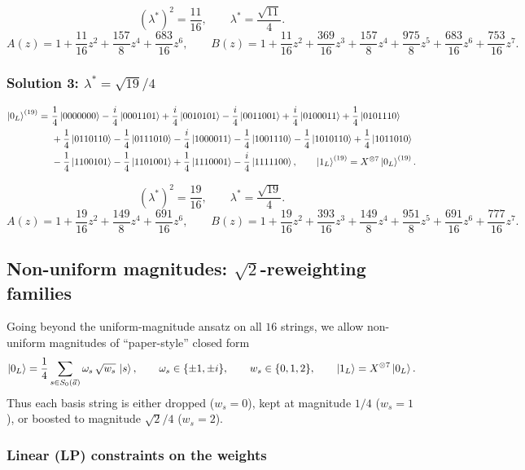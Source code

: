 \documentclass[11pt]{article}
\begin{document}
\[
\boxed{(\lambda^\ast)^2=\frac{11}{16},\qquad \lambda^\ast=\frac{\sqrt{11}}{4}.}
\]
\[
A(z)=1+\frac{11}{16}z^2+\frac{157}{8}z^4+\frac{683}{16}z^6,\qquad
B(z)=1+\frac{11}{16}z^2+\frac{369}{16}z^3+\frac{157}{8}z^4+\frac{975}{8}z^5+\frac{683}{16}z^6+\frac{753}{16}z^7.
\]

\subsubsection{Solution 3: \texorpdfstring{$\lambda^\ast=\sqrt{19}/4$}{lambda*=sqrt19/4}}

\[
\begin{aligned}
\ket{0_L}^{(19)}=
&\ \frac{1}{4}\ket{0000000}
-\frac{i}{4}\ket{0001101}
+\frac{i}{4}\ket{0010101}
-\frac{i}{4}\ket{0011001}
+\frac{i}{4}\ket{0100011}
+\frac{1}{4}\ket{0101110}\\
&\ +\frac{1}{4}\ket{0110110}
-\frac{1}{4}\ket{0111010}
-\frac{i}{4}\ket{1000011}
-\frac{1}{4}\ket{1001110}
-\frac{1}{4}\ket{1010110}
+\frac{1}{4}\ket{1011010}\\
&\ -\frac{1}{4}\ket{1100101}
-\frac{1}{4}\ket{1101001}
+\frac{1}{4}\ket{1110001}
-\frac{i}{4}\ket{1111100},\qquad
\ket{1_L}^{(19)}=X^{\otimes 7}\ket{0_L}^{(19)}.
\end{aligned}
\]

\[
\boxed{(\lambda^\ast)^2=\frac{19}{16},\qquad \lambda^\ast=\frac{\sqrt{19}}{4}.}
\]
\[
A(z)=1+\frac{19}{16}z^2+\frac{149}{8}z^4+\frac{691}{16}z^6,\qquad
B(z)=1+\frac{19}{16}z^2+\frac{393}{16}z^3+\frac{149}{8}z^4+\frac{951}{8}z^5+\frac{691}{16}z^6+\frac{777}{16}z^7.
\]

\subsection{Non-uniform magnitudes: \texorpdfstring{$\sqrt2$}{sqrt2}-reweighting families}

Going beyond the uniform-magnitude ansatz on all \(16\) strings, we allow non-uniform magnitudes of ``paper-style'' closed form
\[
\ket{0_L}=\frac{1}{4}\sum_{s\in S_0(\vec a)} \omega_s\,\sqrt{w_s}\,\ket{s},
\qquad
\omega_s\in\{\pm 1,\pm i\},
\qquad
w_s\in\{0,1,2\},
\qquad
\ket{1_L}=X^{\otimes 7}\ket{0_L}.
\]
Thus each basis string is either dropped (\(w_s=0\)), kept at magnitude \(1/4\) (\(w_s=1\)), or boosted to magnitude \(\sqrt2/4\) (\(w_s=2\)).

\subsubsection{Linear (LP) constraints on the weights}
\end{document}
